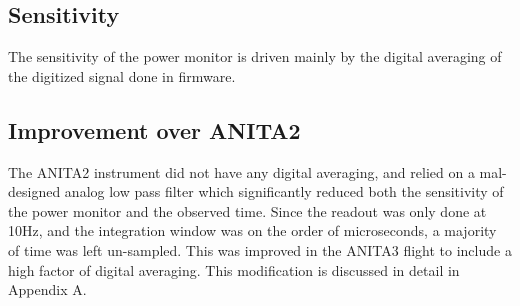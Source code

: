 	
	\subsection{Sensitivity}
		The sensitivity of the power monitor is driven mainly by the digital averaging of the digitized signal done in firmware.
	\subsection{Improvement over ANITA2}
		The ANITA2 instrument did not have any digital averaging, and relied on a mal-designed analog low pass filter which significantly reduced both the sensitivity of the power monitor and the observed time.  Since the readout was only done at 10Hz, and the integration window was on the order of microseconds, a majority of time was left un-sampled.  This was improved in the ANITA3 flight to include a high factor of digital averaging.  This modification is discussed in detail in Appendix A.
	
	
	

